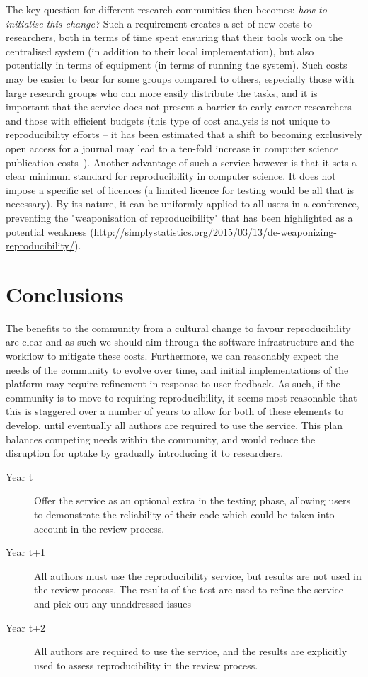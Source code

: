 \documentclass[conference]{IEEEtran}
\begin{document}
The key question for different research communities then becomes:
{\emph{how to initialise this change?}} Such a requirement creates a
set of new costs to researchers, both in terms of time spent ensuring
that their tools work on the centralised system (in addition to their
local implementation), but also potentially in terms of equipment (in
terms of running the system). Such costs may be easier to bear for
some groups compared to others, especially those with large research
groups who can more easily distribute the tasks, and it is important
that the service does not present a barrier to early career
researchers and those with efficient budgets (this type of cost
analysis is not unique to reproducibility efforts -- it has been
estimated that a shift to becoming exclusively open access for a
journal may lead to a ten-fold increase in computer science
publication costs~\cite{vardi-cacm-2014}). Another advantage of such a service
however is that it sets a clear minimum standard for reproducibility
in computer science. It does not impose a specific set of licences 
(a limited licence for testing would be all that is necessary). By its
nature, it can be uniformly applied to all users in a conference, preventing
the "weaponisation of reproducibility" that has been highlighted as a
potential weakness (\url{http://simplystatistics.org/2015/03/13/de-weaponizing-reproducibility/}).


\section{Conclusions}\label{concl}

The benefits to the community from a cultural change to favour
reproducibility are clear and as such we should aim through the
software infrastructure and the workflow to mitigate these
costs. Furthermore, we can reasonably expect the needs of the
community to evolve over time, and initial implementations of the
platform may require refinement in response to user feedback. As such,
if the community is to move to requiring reproducibility, it seems
most reasonable that this is staggered over a number of years to allow
for both of these elements to develop, until eventually all authors
are required to use the service. This plan balances competing needs
within the community, and would reduce the disruption for uptake by
gradually introducing it to researchers.

\begin{description}
\item[Year t] Offer the service as an optional extra in the
  testing phase, allowing users to demonstrate the reliability of
  their code which could be taken into account in the review process.
\item[Year t+1] All authors must use the reproducibility
  service, but results are not used in the review process. The results
  of the test are used to refine the service and pick out any
  unaddressed issues
\item[Year t+2] All authors are required to use the service, and
  the results are explicitly used to assess reproducibility in the
  review process.
\end{description}
\end{document}
